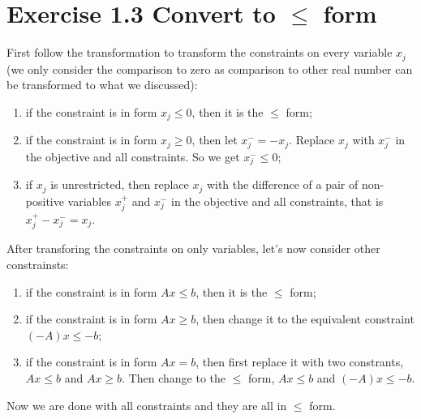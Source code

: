 \section{Exercise 1.3 Convert to $\leq$ form}

First follow the transformation to transform the constraints on every variable $x_j$ (we only consider the comparison to zero as comparison to other real number can be transformed to what we discussed):

\begin{enumerate}
\item if the constraint is in form $x_j \leq 0 $, then it is the $\leq$ form;
\item if the constraint is in form $x_j \geq 0 $, then let $x_j^- = - x_j$. Replace $x_j$ with $x_j^-$ in the objective and all constraints. So we get $x_j^- \leq 0$;
\item if $x_j$ is unrestricted, then replace $x_j$ with the difference of a pair of non-positive variables $x_j^+$ and $x_j^-$ in the objective and all constraints, that is $x_j^+-x_j^- = x_j$.
\end{enumerate}

After transforing the constraints on only variables, let's now consider other constrainsts:

\begin{enumerate}
\item if the constraint is in form $Ax \leq b$, then it is the $\leq$ form;
\item if the constraint is in form $Ax \geq b$, then change it to the equivalent constraint $(-A)x \leq -b$;
\item if the constraint is in form $Ax = b$, then first replace it with two constrants, $Ax \leq b$ and $Ax \geq b$. Then change to the $\leq$ form, $Ax \leq b$ and $(-A)x \leq -b$.
\end{enumerate}

Now we are done with all constraints and they are all in $\leq$ form.